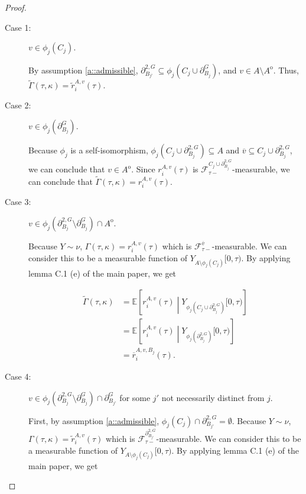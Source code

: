 \documentclass[12pt]{article}
\newcommand{\mb}{\mathbb}
\newcommand{\mc}{\mathcal}
\newcommand{\ov}{\overline}
\newcommand{\ex}[1]{\mb{E}\left[#1\right]}			%
\newcommand{\gneigh}[2]{\partial^{#1}_{#2}}			%
\newcommand{\dgneigh}[2]{\partial^{2,#1}_{#2}}		%
\newcommand{\cl}[1]{\ov{#1}}						%
\newcommand{\rate}{r}								%
\newcommand{\F}{\mc{F}}								%
\newcommand{\vind}[1]{_{#1}}						%
\newcommand{\tme}[1]{(#1)}							%
\newcommand{\tmi}[1]{#1}							%
\newcommand{\vpara}[1]{^{#1}}						%
\newcommand{\stpara}[1]{_{#1}}						%
\newcommand{\tpara}[1]{_{#1}}						%
\newcommand{\gvpara}[2]{^{#1,#2}}					%
\newcommand{\Xg}{Y}									%
\newcommand{\brate}{\alt{\rate}}					%
\newcommand{\inte}[1]{{#1}^\mathrm{o}}				%
\newcommand{\alt}[1]{\tilde{#1}}					%
\newcommand{\rt}{\tau}								%
\renewcommand{\mark}{\kappa}						%
\newcommand{\ratee}{\Gamma}							%
\newcommand{\cratee}{\alt{\ratee}}					%
\newcommand{\mm}{\nu}								%
\newcommand{\bgrate}{\ov{\rate}}					%
\newcommand{\gvjpara}[3]{^{#1,#2,#3}}				%
\begin{document}
\begin{proof}
\begin{description}
\item[Case 1: ] \(v \in \phi_j(C_j)\).

By assumption \ref{a::admissible}, \(\dgneigh{G}{B_{j'}} \subseteq \phi_j(C_j\cup \gneigh{G}{B_j})\), and \(v \in A\setminus\inte{A}\). Thus, \(\cratee(\rt,\mark) = \brate\gvpara{A}{v}\stpara{i}(\rt)\).

\item[Case 2: ] \(v\in \phi_j(\gneigh{G}{B_j})\). 

Because \(\phi_j\) is a self-isomorphism, \(\phi_j\left(C_j\cup\dgneigh{G}{B_j}\right) \subseteq A\) and \(\cl{v} \subseteq C_j\cup\dgneigh{G}{B_j}\), we can conclude that \(v \in \inte{A}\). Since \(\rate\gvpara{A}{v}\stpara{i}(\rt)\) is \(\F\vpara{C_j\cup\dgneigh{G}{B_j}}\tpara{\rt-}\)-measurable, we can conclude that \(\cratee(\rt,\mark) = \rate\gvpara{A}{v}\stpara{i}(\rt)\).

\item[Case 3: ] \(v \in \phi_j(\dgneigh{G}{B_j}\setminus\gneigh{G}{B_j})\cap\inte{A}\).

Because \(\Xg\sim\mm\), \(\ratee(\rt,\mark) = \rate\gvpara{A}{v}\stpara{i}(\rt)\) which is \(\F\vpara{\cl{v}}\tpara{\rt-}\)-measurable. We can consider this to be a measurable function of \(\Xg\vind{A\setminus\phi_j(C_j)}\tmi{[0,\rt)}\). By applying lemma C.1 (e) of the main paper, we get

\begin{align*}
\cratee(\rt,\mark) &= \ex{\rate\gvpara{A}{v}\stpara{i}(\rt)\middle|\Xg\vind{\phi_j\left(C_j\cup\dgneigh{G}{B_j}\right)}\tmi{[0,\rt)}}\\
&= \ex{\rate\gvpara{A}{v}\stpara{i}(\rt)\middle|\Xg\vind{\phi_j\left(\dgneigh{G}{B_j}\right)}\tmi{[0,\rt)}}\\
&= \bgrate\gvjpara{A}{v}{B_j}\stpara{i}\tme{\rt}.
\end{align*}

\item[Case 4: ] \(v \in \phi_j(\dgneigh{G}{B_j}\setminus\gneigh{G}{B_j})\cap \gneigh{G}{B_{j'}}\) for some \(j'\) not necessarily distinct from \(j\).

First, by assumption \ref{a::admissible}, \(\phi_j(C_j)\cap\dgneigh{G}{B_{j'}}= \emptyset\). Because \(\Xg\sim\mm\), \(\ratee(\rt,\mark) = \brate\gvpara{A}{v}\stpara{i}(\rt)\) which is \(\F\vpara{\dgneigh{G}{B_{j'}}}\tpara{\rt-}\)-measurable. We can consider this to be a measurable function of \(\Xg\vind{A\setminus\phi_j(C_j)}\tmi{[0,\rt)}\). By applying lemma C.1 (e) of the main paper, we get


\end{description}
\end{proof}
\end{document}
